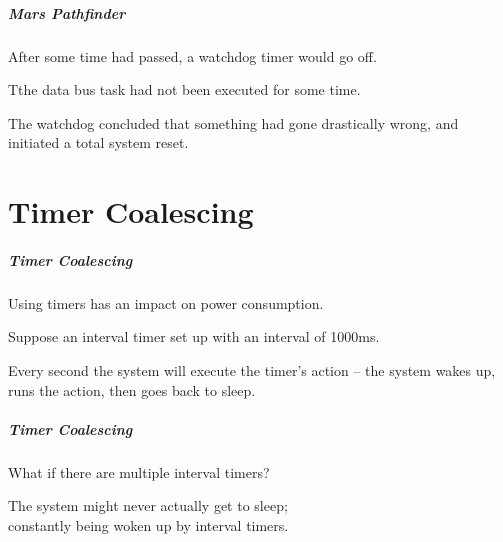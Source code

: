 \begin{frame}
\frametitle{Mars Pathfinder}
\begin{changemargin}{1cm}


After some time had passed, a watchdog timer would go off.

Tthe data bus task had not been executed for some time. 

The watchdog concluded that something had gone drastically wrong, and initiated a total system reset.

\end{changemargin}
\end{frame}

\part{Timer Coalescing}

\begin{frame}
\partpage
\end{frame}

\begin{frame}
\frametitle{Timer Coalescing}
\begin{changemargin}{1cm}

Using timers has an impact on power consumption. 

Suppose an interval timer set up with an interval of 1000ms. 

Every second the system will execute the timer's action -- the system wakes up, runs the action, then goes back to sleep. 

\end{changemargin}
\end{frame}

\begin{frame}
\frametitle{Timer Coalescing}
\begin{changemargin}{1cm}

What if there are multiple interval timers?

The system might never actually get to sleep; \\
\quad constantly being woken up by interval timers.

\end{changemargin}
\end{frame}

